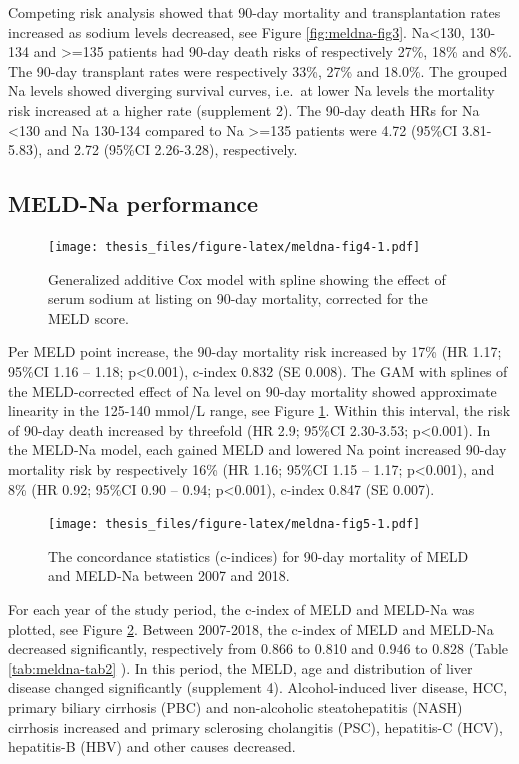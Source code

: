 \documentclass[11pt,english,]{book} %
\begin{document}
Competing risk analysis showed that 90-day mortality and transplantation rates increased as sodium levels decreased, see Figure \ref{fig:meldna-fig3}. Na\textless130, 130-134 and \textgreater=135 patients had 90-day death risks of respectively 27\%, 18\% and 8\%. The 90-day transplant rates were respectively 33\%, 27\% and 18.0\%. The grouped Na levels showed diverging survival curves, i.e.~at lower Na levels the mortality risk increased at a higher rate (supplement 2). The 90-day death HRs for Na \textless130 and Na 130-134 compared to Na \textgreater=135 patients were 4.72 (95\%CI 3.81-5.83), and 2.72 (95\%CI 2.26-3.28), respectively.

\hypertarget{meld-na-performance}{%
\subsection*{MELD-Na performance}\label{meld-na-performance}}

\begin{figure}
\centering
\texttt{[image: thesis\_files/figure-latex/meldna-fig4-1.pdf]}
\caption{\label{fig:meldna-fig4}Generalized additive Cox model with spline showing the effect of serum sodium at listing on 90-day mortality, corrected for the MELD score.}
\end{figure}

Per MELD point increase, the 90-day mortality risk increased by 17\% (HR 1.17; 95\%CI 1.16 -- 1.18; p\textless0.001), c-index 0.832 (SE 0.008). The GAM with splines of the MELD-corrected effect of Na level on 90-day mortality showed approximate linearity in the 125-140 mmol/L range, see Figure \ref{fig:meldna-fig4}. Within this interval, the risk of 90-day death increased by threefold (HR 2.9; 95\%CI 2.30-3.53; p\textless0.001). In the MELD-Na model, each gained MELD and lowered Na point increased 90-day mortality risk by respectively 16\% (HR 1.16; 95\%CI 1.15 -- 1.17; p\textless0.001), and 8\% (HR 0.92; 95\%CI 0.90 -- 0.94; p\textless0.001), c-index 0.847 (SE 0.007).

\begin{figure}
\centering
\texttt{[image: thesis\_files/figure-latex/meldna-fig5-1.pdf]}
\caption{\label{fig:meldna-fig5}The concordance statistics (c-indices) for 90-day mortality of MELD and MELD-Na between 2007 and 2018.}
\end{figure}

For each year of the study period, the c-index of MELD and MELD-Na was plotted, see Figure \ref{fig:meldna-fig5}. Between 2007-2018, the c-index of MELD and MELD-Na decreased significantly, respectively from 0.866 to 0.810 and 0.946 to 0.828 (Table \ref{tab:meldna-tab2} ). In this period, the MELD, age and distribution of liver disease changed significantly (supplement 4). Alcohol-induced liver disease, HCC, primary biliary cirrhosis (PBC) and non-alcoholic steatohepatitis (NASH) cirrhosis increased and primary sclerosing cholangitis (PSC), hepatitis-C (HCV), hepatitis-B (HBV) and other causes decreased.
\end{document}
